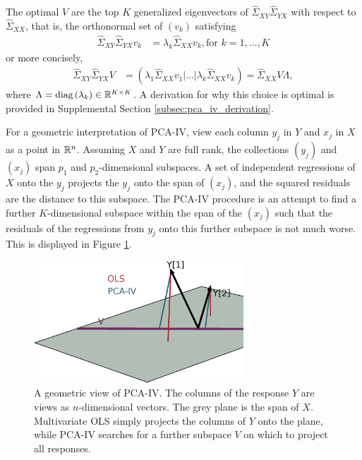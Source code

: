 \documentclass{article}
\begin{document}
The optimal $V$ are the top $K$ generalized eigenvectors of
$\hat{\Sigma}_{XY}\hat{\Sigma}_{YX}$ with respect to $\hat{\Sigma}_{XX}$, that
is, the orthonormal set of $\left(v_{k}\right)$ satisfying
\begin{align*}
  \hat{\Sigma}_{XY}\hat{\Sigma}_{YX}v_{k} &= \lambda_{k}
  \hat{\Sigma}_{XX}v_{k}, \text{for } k = 1, \dots, K
\end{align*}
or more concisely,
\begin{align*}
\hat{\Sigma}_{XY}\hat{\Sigma}_{YX}V &= \left( \lambda_{1}
  \hat{\Sigma}_{XX}v_{1} \vert \dots \vert
  \lambda_{k}\hat{\Sigma}_{XX}v_{k}\right) =
\hat{\Sigma}_{XX}V\Lambda,
\end{align*}
where $\Lambda = \mathop\mathrm{diag}\left(\lambda_{k}\right) \in \mathbb{R}^{K \times K}$. A
derivation for why this choice is optimal is provided in Supplemental Section
\ref{subsec:pca_iv_derivation}.

For a geometric interpretation of PCA-IV, view each column $y_{j}$ in $Y$ and
$x_{j}$ in $X$ as a point in $\mathbb{R}^{n}$. Assuming $X$ and $Y$ are full rank,
the collections $\left(y_{j}\right)$ and $\left(x_{j}\right)$ span $p_{1}$ and
$p_{2}$-dimensional subspaces. A set of independent regressions of $X$ onto the
$y_{j}$ projects the $y_{j}$ onto the span of $\left(x_{j}\right)$, and the
squared residuals are the distance to this subspace. The PCA-IV procedure is an
attempt to find a further $K$-dimensional subspace within the span of the
$\left(x_{j}\right)$ such that the residuals of the regressions from $y_j$ onto
this further subspace is not much worse. This is displayed in Figure
\ref{fig:pca_iv_geometry}.

\begin{figure}
  \centering
  \includegraphics[width=0.7\textwidth]{figure/pca_iv/pca_iv_geometry}
  \caption{A geometric view of PCA-IV. The columns of the response $Y$ are views
    as $n$-dimensional vectors. The grey plane is the span of
    $X$. Multivariate OLS simply projects the columns of $Y$ onto the plane,
    while PCA-IV searches for a further subspace $V$ on which to project all
    responses. \label{fig:pca_iv_geometry} }
\end{figure}
\end{document}
